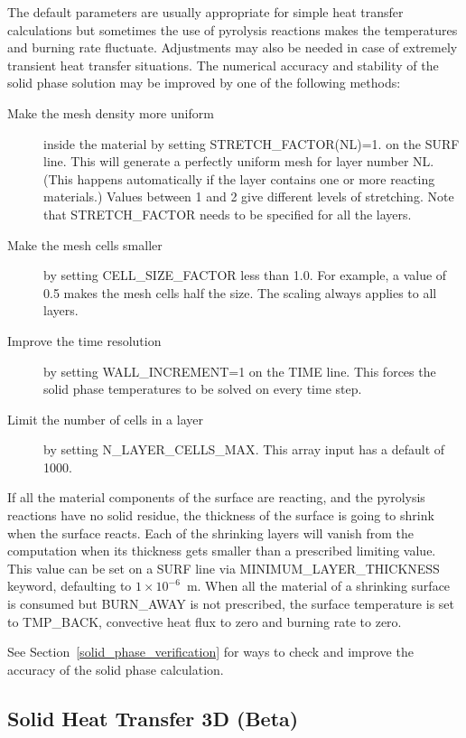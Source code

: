 \documentclass[11pt]{book}
\begin{document}
The default parameters are usually appropriate for simple heat transfer calculations but sometimes the use of pyrolysis reactions
makes the temperatures and burning rate fluctuate. Adjustments may also be needed in case of
extremely transient heat transfer situations. The numerical accuracy and stability of the solid phase solution may be improved by
one of the following methods:
\begin{description}
\item[Make the mesh density more uniform ] inside the material by setting {\ct STRETCH\_FACTOR(NL)=1.} on the {\ct SURF} line. This will generate a perfectly uniform mesh for layer number {\ct NL}. (This happens automatically if the layer contains one or more reacting materials.) Values between 1 and 2 give different levels of stretching. Note that {\ct STRETCH\_FACTOR} needs to be specified for all the layers.
\item[Make the mesh cells smaller] by setting {\ct CELL\_SIZE\_FACTOR} less than 1.0. For example, a value of 0.5 makes the mesh cells half the size. The scaling always applies to all layers.
\item[Improve the time resolution] by setting {\ct WALL\_INCREMENT=1} on the {\ct TIME} line. This forces the solid phase temperatures to be solved on every time step.
\item[Limit the number of cells in a layer] by setting {\ct N\_LAYER\_CELLS\_MAX}. This array input has a default of 1000.
\end{description}
If all the material components of the surface are reacting, and the pyrolysis reactions have no solid residue, the thickness of
the surface is going to shrink when the surface reacts. Each of the shrinking layers will vanish from the computation when its thickness gets
smaller than a prescribed limiting value. This value can be set on a {\ct SURF} line via {\ct MINIMUM\_LAYER\_THICKNESS} keyword,
defaulting to $1 \times 10^{-6}$~m. When all the material of a shrinking surface is consumed but {\ct BURN\_AWAY} is not
prescribed, the surface temperature is set to {\ct TMP\_BACK}, convective heat flux to zero and burning rate to zero.

See Section~\ref{solid_phase_verification} for ways to check and improve the accuracy of the solid phase calculation.


\subsection{Solid Heat Transfer 3D (Beta)}
\label{info:ht3d}
\end{document}
